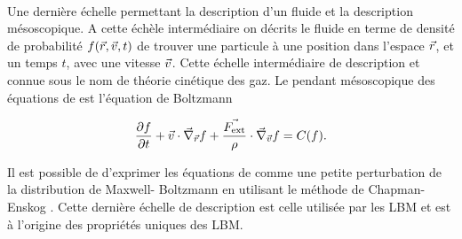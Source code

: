 \paragraph*{}
  Une dernière échelle permettant la description d'un fluide et la description mésoscopique.
  A cette échèle intermédiaire on décrits le fluide en terme de densité de probabilité $f(\vec{r},\vec{v}, t)$ de trouver une 
  particule à une position dans l'espace $\vec{r}$, et un temps $t$, avec une vitesse $\vec{v}$.
  Cette échelle intermédiaire de description et connue sous le nom de théorie cinétique des gaz.
  Le pendant mésoscopique des équations de \NS{} est l'équation de Boltzmann
  
  \begin{equation} \label{eq:Bol}
    \pderiv{f}{t} + \v \cdot \vnabla_{\r} f + \frac{\F}{\rho} \cdot \vnabla_{\v} f = C(f).
  \end{equation}
    
  Il est possible de d'exprimer les équations de \NS{} comme une petite perturbation de la distribution de Maxwell-
  Boltzmann en utilisant le méthode de Chapman-Enskog \cite{REIDER1995459}.
  Cette dernière échelle de description est celle utilisée par les LBM et est à l'origine des propriétés uniques des LBM.
